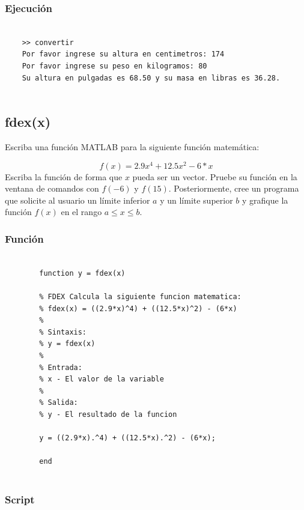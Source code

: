 \documentclass{article}
\begin{document}
	\subsubsection{Ejecución}
	
	\begin{lstlisting}
		
	>> convertir
	Por favor ingrese su altura en centimetros: 174
	Por favor ingrese su peso en kilogramos: 80
	Su altura en pulgadas es 68.50 y su masa en libras es 36.28.
		
	\end{lstlisting}

	\subsection{fdex(x)}
	
	Escriba una función MATLAB para la siguiente función matemática:
	
	\begin{equation*}
		f(x) = 2.9x^4 + 12.5x^2 - 6*x
	\end{equation*}
	\newline
	Escriba la función de forma que $x$ pueda ser un vector. Pruebe su función en la ventana de comandos con $f(-6)$ y $f(15)$. Posteriormente, cree un programa que solicite al usuario un límite inferior $a$ y un límite superior $b$ y grafique la función $f(x)$ en el rango $a \leq x \leq b$.
	
	\subsubsection{Función}
	
	\begin{lstlisting}
		
		function y = fdex(x)
		
		% FDEX Calcula la siguiente funcion matematica:
		% fdex(x) = ((2.9*x)^4) + ((12.5*x)^2) - (6*x)
		%
		% Sintaxis:
		% y = fdex(x)
		%
		% Entrada:
		% x - El valor de la variable
		%
		% Salida:
		% y - El resultado de la funcion
		
		y = ((2.9*x).^4) + ((12.5*x).^2) - (6*x);
		
		end
		
	\end{lstlisting}
	
	\subsubsection{Script}
	
\end{document}

